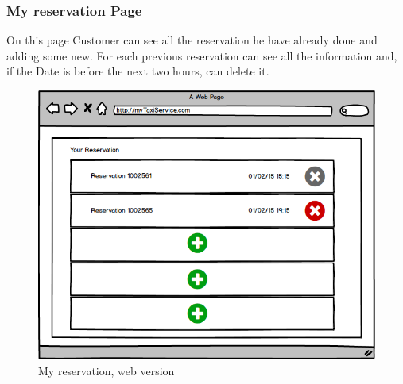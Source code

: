 \documentclass{report}
\begin{document}
			\subsubsection{My reservation Page}
			On this page Customer can see all the reservation he have already done and adding some new. For each previous reservation can see all the information and, if the Date is before the next two hours, can delete it.			
			
				\begin{figure}[H]
					\centering
					\includegraphics[scale=0.5]{IMG/UserInterfaces/myReservation.png}
					\caption{My reservation, web version}\label{myreservation_w}
				\end{figure}
\end{document}
